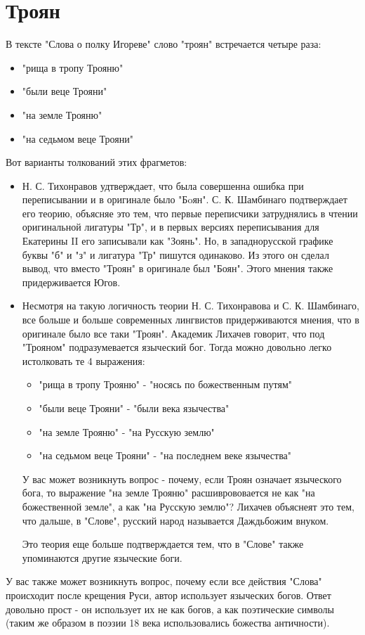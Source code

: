 \documentclass[14pt, a4paper]{article}
\begin{document}
\section{Троян}
В тексте "Слова о полку Игореве" слово "троян" встречается четыре раза:
\begin{itemize}
  \item "рища в тропу Трояню"
  \item "были веце Трояни"
  \item "на земле Трояню"
  \item "на седьмом веце Трояни"
\end{itemize}
Вот варианты толкований этих фрагметов:
\begin{itemize}
    \item Н. С. Тихонравов удтверждает, что была совершенна ошибка при переписывании и в оригинале было "Бoян". С. К. Шамбинаго подтверждает его теорию, объясняе это тем, что первые переписчики затруднялись в чтении оригинальной лигатуры "Тр", и в первых версиях переписывания для Екатерины II его записывали как "Зоянь". Но, в западнорусской графике буквы "б" и "з" и лигатура "Тр" пишутся одинаково. Из этого он сделал вывод, что вместо "Троян" в оригинале был "Боян". Этого мнения также придерживается Югов.
    \item Несмотря на такую логичность теории Н. С. Тихонравова и С. К. Шамбинаго, все больше и больше современных лингвистов придерживаются мнения, что в оригинале было все таки "Троян". Академик Лихачев говорит, что под "Трояном" подразумевается языческий бог. Тогда можно довольно легко истолковать те 4 выражения:
    \begin{itemize}
      \item "рища в тропу Трояню" - "носясь по божественным путям"
      \item "были веце Трояни" - "были века язычества"
      \item "на земле Трояню" - "на Русскую землю"
      \item "на седьмом веце Трояни" - "на последнем веке язычества"
    \end{itemize}
    У вас может возникнуть вопрос - почему, если Троян означает языческого бога, то выражение "на земле Трояню" расшиврововается не как "на божественной земле", а как "на Русскую землю"? Лихачев объяснеят это тем, что дальше, в "Слове", русский народ называется Даждьбожим внуком.
    \par Это теория еще больше подтверждается тем, что в "Слове" также упоминаются другие языческие боги.
\end{itemize}
У вас также может возникнуть вопрос, почему если все действия "Слова" происходит после крещения Руси, автор использует языческих богов. Ответ довольно прост - он использует их не как богов, а как поэтические символы (таким же образом в поэзии 18 века использовались божества античности).
\end{document}
